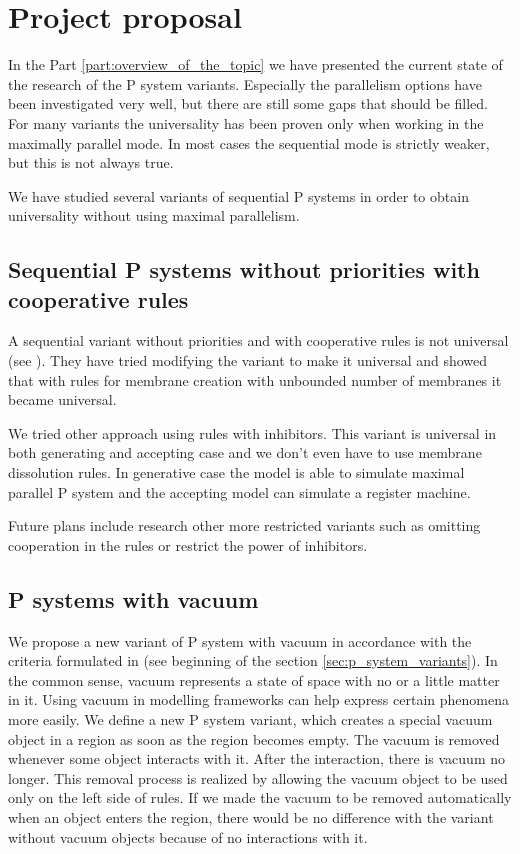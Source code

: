 \chapter{Project proposal} %
\label{cha:project_proposal}

In the Part \ref{part:overview_of_the_topic} we have presented the current state of the research of the P system variants. Especially the parallelism options have been investigated very well, but there are still some gaps that should be filled. For many variants the universality has been proven only when working in the maximally parallel mode. In most cases the sequential mode is strictly weaker, but this is not always true.

We have studied several variants of sequential P systems in order to obtain universality without using maximal parallelism.

\section{Sequential P systems without priorities with cooperative rules} %
\label{sec:sequential_p_systems_without_priorities_with_cooperative_rules}

A sequential variant without priorities and with cooperative rules is not universal (see \cite{Ibarra04dang}). They have tried modifying the variant to make it universal and showed that with rules for membrane creation with unbounded number of membranes it became universal.

We tried other approach using rules with inhibitors. This variant is universal in both generating and accepting case and we don't even have to use membrane dissolution rules. In generative case the model is able to simulate maximal parallel P system and the accepting model can simulate a register machine.

Future plans include research other more restricted variants such as omitting cooperation in the rules or restrict the power of inhibitors.

\section{P systems with vacuum} %
\label{sec:p_systems_with_vacuum}

We propose a new variant of P system with vacuum in accordance with the criteria formulated in \cite{Besozzi:PhD:2004} (see beginning of the section \ref{sec:p_system_variants}). In the common sense, vacuum represents a state of space with no or a little matter in it. Using vacuum in modelling frameworks can help express certain phenomena more easily. We define a new P system variant, which creates a special vacuum object in a region as soon as the region becomes empty. The vacuum is removed whenever some object interacts with it. After the interaction, there is vacuum no longer. This removal process is realized by allowing the vacuum object to be used only on the left side of rules. If we made the vacuum to be removed automatically when an object enters the region, there would be no difference with the variant without vacuum objects because of no interactions with it.

